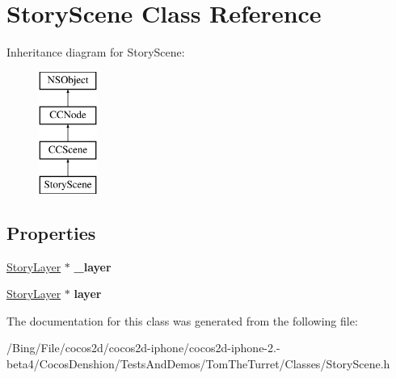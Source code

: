 \hypertarget{interface_story_scene}{\section{Story\-Scene Class Reference}
\label{interface_story_scene}
}
Inheritance diagram for Story\-Scene\-:\begin{figure}[H]
\begin{center}
\leavevmode
\includegraphics[height=4.000000cm]{interface_story_scene}
\end{center}
\end{figure}
\subsection*{Properties}
\begin{DoxyCompactItemize}
\item 
\hypertarget{interface_story_scene_a4b66a8b01d2ca3761dc1a3e096a1577a}{\hyperlink{interface_story_layer}{Story\-Layer} $\ast$ {\bfseries \-\_\-layer}}\label{interface_story_scene_a4b66a8b01d2ca3761dc1a3e096a1577a}

\item 
\hypertarget{interface_story_scene_a31ff396eca2f1124bfa7c0211c6fa127}{\hyperlink{interface_story_layer}{Story\-Layer} $\ast$ {\bfseries layer}}\label{interface_story_scene_a31ff396eca2f1124bfa7c0211c6fa127}

\end{DoxyCompactItemize}


The documentation for this class was generated from the following file\-:\begin{DoxyCompactItemize}
\item 
/\-Bing/\-File/cocos2d/cocos2d-\/iphone/cocos2d-\/iphone-\/2.-\/beta4/\-Cocos\-Denshion/\-Tests\-And\-Demos/\-Tom\-The\-Turret/\-Classes/Story\-Scene.\-h\end{DoxyCompactItemize}
